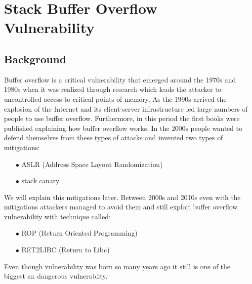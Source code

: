\chapter{Stack Buffer Overflow Vulnerability}
    \section{Background} 
    Buffer overflow is a critical vulnerability that emerged around the 1970s and 1980s when it was 
    realized through research which leads the attacker to uncontrolled access to critical points of memory.\newline
    As the 1990s arrived the explosion of the Internet and its client-server infrastructure led large numbers of people to use buffer overflow.\newline
    Furthermore, in this period the first books were published explaining how buffer overflow works.\newline
    In the 2000s people wanted to defend themselves from these types of attacks and invented two types of mitigations:\newline
    \begin{itemize}
        \item[$\bullet$] ASLR (Address Space Layout Randomization)
        \item[$\bullet$] stack canary 
    \end{itemize}
    We will explain this mitigations later.\newline
    Between 2000s and 2010s even with the mitigations attackers managed to avoid them and still exploit buffer overflow vulnerability with technique called:\newline
        \begin{itemize}
        \item[$\bullet$] ROP (Return Oriented Programming)
        \item[$\bullet$] RET2LIBC (Return to Libc)
    \end{itemize}
    Even though vulnerability was born so many years ago it still is one of the biggest an dangerous vulnerablity.
    \clearpage
  
